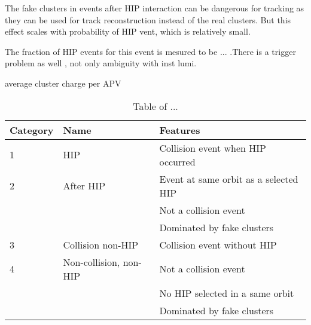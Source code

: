 The fake clusters in events after HIP interaction can be dangerous for tracking as they can be used for track reconstruction instead of the real clusters. But this effect scales with probability of HIP vent, which is relatively small.

The fraction of HIP events for this event is mesured to be ... .There is a trigger problem as well , not only ambiguity with inst lumi.

average cluster charge per APV


\begin{table}[h]
\begin{center}
\begin{tabular}{|l|l|l|}
\hline
Category & Name  & Features \\
\hline
1 & HIP & Collision event when HIP occurred \\
\hline
2 & After HIP & Event at same orbit as a selected HIP \\
& & Not a collision event \\
& & Dominated by fake clusters \\
\hline
3 & Collision non-HIP & Collision event without HIP \\
\hline
4 & Non-collision, non-HIP  & Not a collision event \\
& & No HIP selected in a same orbit \\
& & Dominated by fake clusters \\
\hline
\end{tabular}
\caption[Table caption text]{Table of ... }
\label{tab:eventCategories}
\end{center}
\end{table}


\begin{table}
\begin{center}
\caption[Table caption text]{Table of ... }
\label{tab:clusterCategories}
\end{center}
\end{table}


